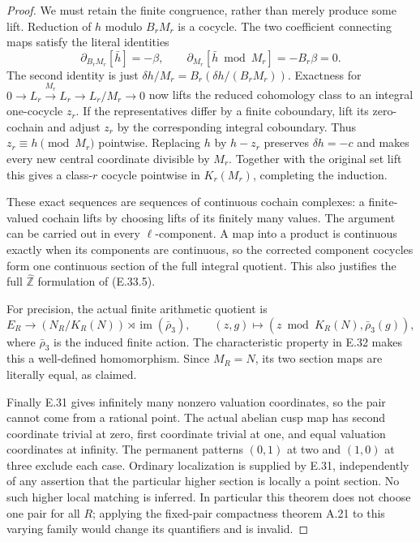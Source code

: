 \begin{proof}
We must retain the finite congruence, rather than merely produce some
lift.  Reduction of $h$ modulo $B_rM_r$ is a cocycle.  The two
coefficient connecting maps satisfy the literal identities
\[
 \partial_{B_rM_r}[\bar h]=-\beta,\qquad
 \partial_{M_r}[\bar h\bmod M_r]=-B_r\beta=0.
 \tag{E.33.5}
\]
The second identity is just
$\delta h/M_r=B_r(\delta h/(B_rM_r))$.  Exactness for
$0\to L_r\xrightarrow{M_r}L_r\to L_r/M_r\to0$ now lifts the
reduced cohomology class to an integral one-cocycle $z_r$.  If the
representatives differ by a finite coboundary, lift its zero-cochain
and adjust $z_r$ by the corresponding integral coboundary.  Thus
$z_r\equiv h\pmod{M_r}$ pointwise.  Replacing $h$ by $h-z_r$
preserves $\delta h=-c$ and makes every new central coordinate
divisible by $M_r$.  Together with the original set lift this gives
a class-$r$ cocycle pointwise in $K_r(M_r)$, completing the induction.

These exact sequences are sequences of continuous cochain complexes:
a finite-valued cochain lifts by choosing lifts of its finitely many
values.  The argument can be carried out in every $\ell$-component.
A map into a product is continuous exactly when its components are
continuous, so the corrected component cocycles form one continuous
section of the full integral quotient.  This also justifies the full
$\widehat{\mathbb Z}$ formulation of (E.33.5).

For precision, the actual finite arithmetic quotient is
\[
 E_R\longrightarrow
 (N_R/K_R(N))\rtimes\operatorname{im}(\bar\rho_3),\qquad
 (z,g)\longmapsto(z\bmod K_R(N),\bar\rho_3(g)),
 \tag{E.33.6}
\]
where $\bar\rho_3$ is the induced finite action.  The characteristic
property in E.32 makes this a well-defined homomorphism.  Since
$M_R=N$, its two section maps are literally equal, as claimed.

Finally E.31 gives infinitely many nonzero valuation coordinates,
so the pair cannot come from a rational point.  The actual abelian
cusp map has second coordinate trivial at zero, first coordinate
trivial at one, and equal valuation coordinates at infinity.
The permanent patterns $(0,1)$ at two and $(1,0)$ at three exclude
each case.  Ordinary localization is supplied by E.31, independently
of any assertion that the particular higher section is locally a
point section.  No such higher local matching is inferred.  In
particular this theorem does not choose one pair for all $R$; applying
the fixed-pair compactness theorem A.21 to this varying family would
change its quantifiers and is invalid.
\end{proof}

